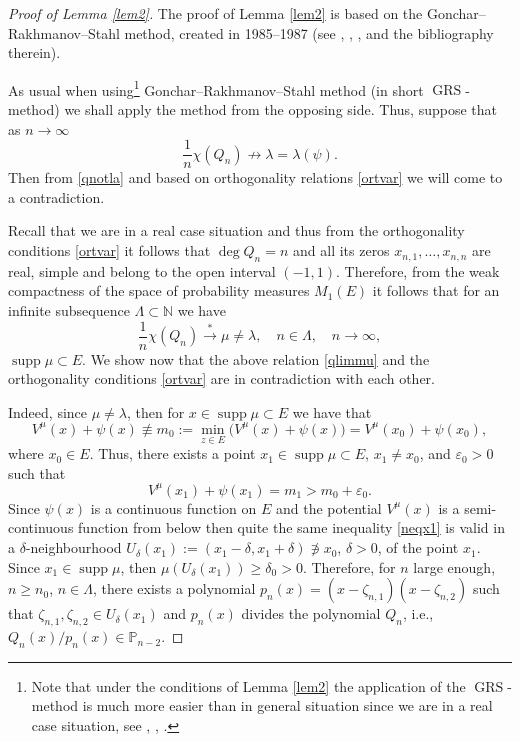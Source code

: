 \documentclass[11pt, a4paper, twoside]{article}
\let\geq\geqslant
\let\eps\varepsilon
\def\NN{\mathbb N}
\def\PP{\mathbb P}
\def\supp{\operatorname{supp}}
\def\mdeg{\operatorname{deg}}
\def\GRS{\operatorname{GRS}}
\theoremstyle{plain}
\theoremstyle{definition}
\begin{document}
\begin{proof}[Proof of Lemma \ref{lem2}]
The proof of Lemma \ref{lem2} is based on the Gonchar--Rakhmanov--Stahl method, created in 1985--1987
(see \cite{Sta97b}, \cite{GoRa87}, \cite{RaSu13}, \cite{Rak16} and the bibliography therein).

As usual when using\footnote{Note that under the conditions of Lemma \ref{lem2} the application of the $\GRS$-method is much more easier than in general situation since we are in a real case situation, see \cite{Sta97b}, \cite{GoRa87}, \cite{Rak16}.} Gonchar--Rakhmanov--Stahl method (in short $\GRS$-method) we shall apply the method from the opposing side. Thus, suppose  that as  $n\to\infty$
\begin{equation}
\frac1n\chi(Q_{n})\not\rightarrow\lambda=\lambda(\psi).
\label{qnotla}
\end{equation}
Then from \eqref{qnotla} and based on orthogonality relations \eqref{ortvar} we will come to a contradiction.

Recall that we are in a real case situation and thus from the orthogonality conditions \eqref{ortvar} it follows that $\mdeg{Q_n}=n$ and all its zeros $x_{n,1},\dots,x_{n,n}$ are real, simple  and belong to the open interval $(-1,1)$. Therefore, from the weak compactness of the space of probability measures $M_1(E)$ it follows that for an infinite subsequence $\Lambda\subset\NN$ we have
\begin{equation}
\frac1n\chi(Q_{n}){\overset{*}\longrightarrow}\mu\neq\lambda,
\quad n\in\Lambda,\quad n\to\infty,
\label{qlimmu}
\end{equation}
$\supp{\mu}\subset{E}$. 
We show now that the above relation \eqref{qlimmu} and the orthogonality conditions \eqref{ortvar} are in contradiction with each other.

Indeed, since $\mu\neq\lambda$, then
for $x\in \supp{\mu}\subset E$ we have that
$$
V^\mu(x)+\psi(x)\not\equiv m_0
:=\min_{z\in E}\bigl(V^\mu(x)+\psi(x)\bigr)=V^\mu(x_0)+\psi(x_0),
$$
where $x_0\in E$. Thus, there exists a point
$x_1\in \supp{\mu}\subset E$, $x_1\neq x_0$, and $\eps_0>0$ such that 
\begin{equation}
V^\mu(x_1)+\psi(x_1)=m_1>m_0+\eps_0.
\label{neqx1}
\end{equation}
Since $\psi(x)$ is a continuous function on $E$ and the potential
$V^\mu(x)$ is a semi-continuous function from below then quite the same inequality \eqref{neqx1} is valid in a $\delta$-neighbourhood 
$U_\delta(x_1):=(x_1-\delta,x_1+\delta)\not\ni x_0$, $\delta>0$, of the point $x_1$. Since $x_1\in \supp{\mu}$, then $\mu(U_\delta(x_1))\geq\delta_0>0$. Therefore, for $n$ large enough, $n\geq n_0$, $n\in\Lambda$, there exists a polynomial $p_n(x)=(x-\zeta_{n,1})(x-\zeta_{n,2})$ such that $\zeta_{n,1},\zeta_{n,2}\in U_\delta(x_1)$ and $p_n(x)$  divides the polynomial $Q_{n}$, i.e., $Q_{n}(x)/p_n(x)\in\PP_{n-2}$.


\end{proof}
\end{document}
